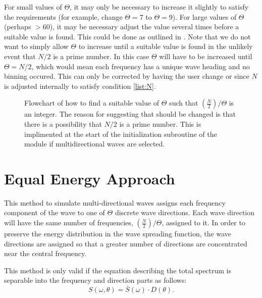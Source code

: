 For small values of $\Theta$, it may only be necessary to increase it slightly to satisfy the requirements (for example, change $\Theta=7$ to $\Theta=9$).  For large values of $\Theta$ (perhaps $>60$), it may be necessary adjust the value several times before a suitable value is found.  This could be done as outlined in .  Note that we do not want to simply allow $\Theta$ to increase until a suitable value is found in the unlikely event that $N/2$ is a prime number.  In this case $\Theta$ will have to be increased until $\Theta=N/2$, which would mean each frequency has a unique wave heading and no binning occured.  This can only be corrected by having the user change  or  since $N$ is adjusted internally to satisfy condition \ref{list:N}.
\begin{figure}
   \centering
   \caption[Flowchart of how to find a suitable value of $\Theta$]{Flowchart of how to find a suitable value of $\Theta$ such that $(\frac{N}{2})/\Theta$ is an integer.  The reason for suggesting that  should be changed is that there is a possibility that $N/2$ is a prime number.  This is implimented at the start of the initialization subroutine of the  module if multidirectional waves are selected.\label{fig:Theta:Adjust}}  
\end{figure}
 



\section{Equal Energy Approach}
\label{sec:MultiDir:EqEnergy}



This method to simulate multi-directional waves assigns each frequency component of the wave to one of $\Theta$ discrete wave directions.  Each wave direction will have the same number of frequencies, $(\frac{N}{2})/\Theta$, assigned to it.  In order to preserve the energy distribution in the wave spreading function, the wave directions are assigned so that a greater number of directions are concentrated near the central frequency.

This method is only valid if the equation describing the total spectrum is separable into the frequency and direction parts as follows:
\begin{equation}
   S(\omega,\theta) = \bar{S}(\omega) \cdot D(\theta).
\label{eq:totalspectrum}
\end{equation}


